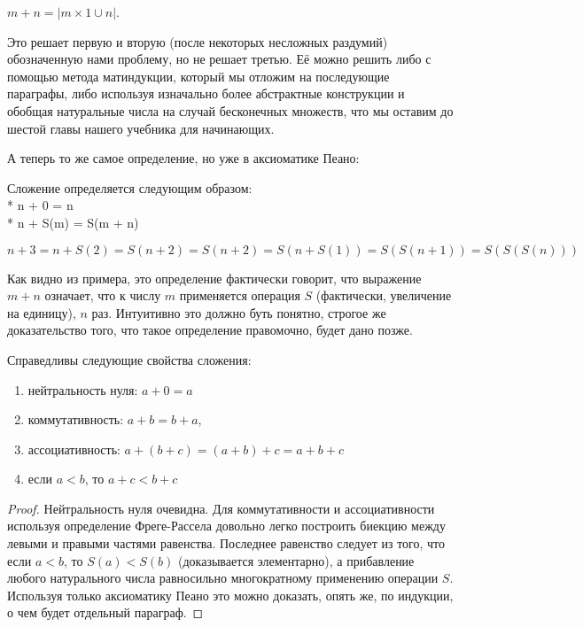 \begin{definition}
$m + n = |m\times1 \cup n|$.
\end{definition}

Это решает первую и вторую (после некоторых несложных раздумий) обозначенную нами проблему, но не решает третью. Её можно решить либо с помощью метода матиндукции, который мы отложим на последующие параграфы, либо используя изначально более абстрактные конструкции и обобщая натуральные числа на случай бесконечных множеств, что мы оставим до шестой главы нашего учебника для начинающих.

А теперь то же самое определение, но уже в аксиоматике Пеано:

\begin{definition}
Сложение определяется следующим образом:\\*
n + 0 = n\\*
n + S(m) = S(m + n)
\end{definition}

\begin{example}
$$n + 3 = n + S(2) = S(n+2) = S(n+2)
=S(n+S(1)) = S(S(n+1)) = S(S(S(n)))$$
\end{example}

Как видно из примера, это определение фактически говорит, что выражение $m + n$ означает, что к числу $m$ применяется операция $S$ (фактически, увеличение на единицу), $n$ раз. Интуитивно это должно буть понятно, строгое же доказательство того, что такое определение правомочно, будет дано позже.

\begin{thm}
Справедливы следующие свойства сложения:
\begin{enumerate}
\item нейтральность нуля: $a + 0 = a$
\item коммутативность: $a + b = b + a$,
\item ассоциативность: $a + (b + c) = (a + b) + c = a + b + c$
\item если $a < b$, то $a + c < b + c$
\end{enumerate}
\end{thm}
\begin{proof}
Нейтральность нуля очевидна. Для коммутативности и ассоциативности используя определение Фреге-Рассела довольно легко построить биекцию между левыми и правыми частями равенства. Последнее равенство следует из того, что если $a < b$, то $S(a) < S(b)$ (доказывается элементарно), а прибавление любого натурального числа равносильно многократному применению операции $S$. Используя только аксиоматику Пеано это можно доказать, опять же, по индукции, о чем будет отдельный параграф.
\end{proof}


